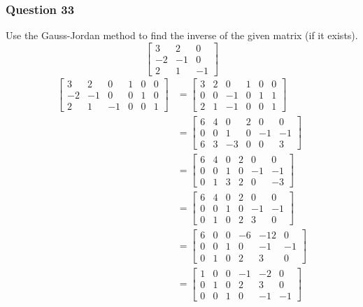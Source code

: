 \documentclass{math}
\begin{document}
\subsubsection*{Question 33}
Use the Gauss-Jordan method to find the inverse of the given matrix (if it
exists).
\[ \begin{bmatrix}
  3 & 2 & 0 \\
  -2 & -1 & 0 \\
  2 & 1 & -1
\end{bmatrix} \]
\begin{align*}
  \begin{bmatrix}
    3 & 2 & 0 & 1 & 0 & 0 \\
    -2 & -1 & 0 & 0 & 1 & 0 \\
    2 & 1 & -1 & 0 & 0 & 1
  \end{bmatrix} &= \begin{bmatrix}
    3 & 2 & 0 & 1 & 0 & 0 \\
    0 & 0 & -1 & 0 & 1 & 1 \\
    2 & 1 & -1 & 0 & 0 & 1
  \end{bmatrix} \\
  &= \begin{bmatrix}
    6 & 4 & 0 & 2 & 0 & 0 \\
    0 & 0 & 1 & 0 & -1 & -1 \\
    6 & 3 & -3 & 0 & 0 & 3
  \end{bmatrix} \\
  &= \begin{bmatrix}
    6 & 4 & 0 & 2 & 0 & 0 \\
    0 & 0 & 1 & 0 & -1 & -1 \\
    0 & 1 & 3 & 2 & 0 & -3
  \end{bmatrix} \\
  &= \begin{bmatrix}
    6 & 4 & 0 & 2 & 0 & 0 \\
    0 & 0 & 1 & 0 & -1 & -1 \\
    0 & 1 & 0 & 2 & 3 & 0
  \end{bmatrix} \\
  &= \begin{bmatrix}
    6 & 0 & 0 & -6 & -12 & 0 \\
    0 & 0 & 1 & 0 & -1 & -1 \\
    0 & 1 & 0 & 2 & 3 & 0
  \end{bmatrix} \\
  &= \begin{bmatrix}
    1 & 0 & 0 & -1 & -2 & 0 \\
    0 & 1 & 0 & 2 & 3 & 0 \\
    0 & 0 & 1 & 0 & -1 & -1
  \end{bmatrix}
\end{align*}
\end{document}

